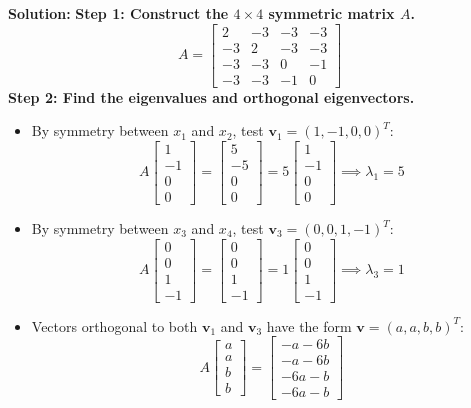 \documentclass[11pt, letterpaper]{article}
\theoremstyle{definition}
\theoremstyle{remark}
\begin{document}
\textbf{Solution:}
\textbf{Step 1: Construct the $4 \times 4$ symmetric matrix $A$.}
\[
A = \begin{bmatrix} 2 & -3 & -3 & -3 \\ -3 & 2 & -3 & -3 \\ -3 & -3 & 0 & -1 \\ -3 & -3 & -1 & 0 \end{bmatrix}
\]
\textbf{Step 2: Find the eigenvalues and orthogonal eigenvectors.}
\begin{itemize}
    \item By symmetry between $x_1$ and $x_2$, test $\mathbf{v}_1 = (1, -1, 0, 0)^T$:
    \[
    A \begin{bmatrix} 1 \\ -1 \\ 0 \\ 0 \end{bmatrix} = \begin{bmatrix} 5 \\ -5 \\ 0 \\ 0 \end{bmatrix} = 5 \begin{bmatrix} 1 \\ -1 \\ 0 \\ 0 \end{bmatrix} \implies \lambda_1 = 5
    \]
    \item By symmetry between $x_3$ and $x_4$, test $\mathbf{v}_3 = (0, 0, 1, -1)^T$:
    \[
    A \begin{bmatrix} 0 \\ 0 \\ 1 \\ -1 \end{bmatrix} = \begin{bmatrix} 0 \\ 0 \\ 1 \\ -1 \end{bmatrix} = 1 \begin{bmatrix} 0 \\ 0 \\ 1 \\ -1 \end{bmatrix} \implies \lambda_3 = 1
    \]
    \item Vectors orthogonal to both $\mathbf{v}_1$ and $\mathbf{v}_3$ have the form $\mathbf{v} = (a, a, b, b)^T$:
    \[
    A \begin{bmatrix} a \\ a \\ b \\ b \end{bmatrix} = \begin{bmatrix} -a - 6b \\ -a - 6b \\ -6a - b \\ -6a - b \end{bmatrix}
\]
\end{itemize}
\end{document}
